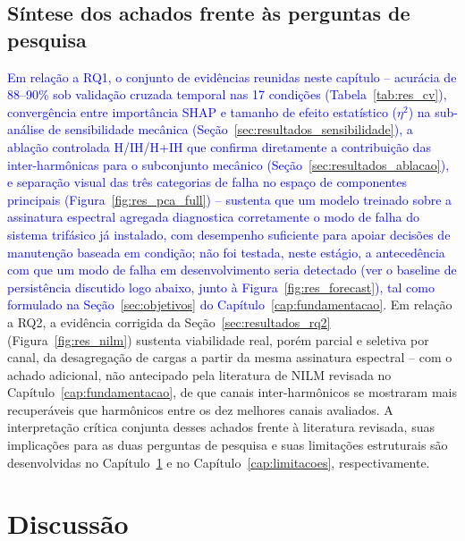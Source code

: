 \documentclass[times,final]{elsarticle}
\begin{document}
\subsection{Síntese dos achados frente às perguntas de pesquisa}
\label{sec:resultados_sintese}

\textcolor{blue}{Em relação a RQ1, o conjunto de evidências reunidas neste capítulo -- acurácia de 88--90\% sob validação cruzada temporal nas 17 condições (Tabela~\ref{tab:res_cv}), convergência entre importância SHAP e tamanho de efeito estatístico ($\eta^2$) na sub-análise de sensibilidade mecânica (Seção~\ref{sec:resultados_sensibilidade}), a ablação controlada H/IH/H+IH que confirma diretamente a contribuição das inter-harmônicas para o subconjunto mecânico (Seção~\ref{sec:resultados_ablacao}), e separação visual das três categorias de falha no espaço de componentes principais (Figura~\ref{fig:res_pca_full}) -- sustenta que um modelo treinado sobre a assinatura espectral agregada diagnostica corretamente o modo de falha do sistema trifásico já instalado, com desempenho suficiente para apoiar decisões de manutenção baseada em condição; não foi testada, neste estágio, a antecedência com que um modo de falha em desenvolvimento seria detectado (ver o baseline de persistência discutido logo abaixo, junto à Figura~\ref{fig:res_forecast}), tal como formulado na Seção~\ref{sec:objetivos} do Capítulo~\ref{cap:fundamentacao}.} Em relação a RQ2, a evidência corrigida da Seção~\ref{sec:resultados_rq2} (Figura~\ref{fig:res_nilm}) sustenta viabilidade real, porém parcial e seletiva por canal, da desagregação de cargas a partir da mesma assinatura espectral -- com o achado adicional, não antecipado pela literatura de NILM revisada no Capítulo~\ref{cap:fundamentacao}, de que canais inter-harmônicos se mostraram mais recuperáveis que harmônicos entre os dez melhores canais avaliados. A interpretação crítica conjunta desses achados frente à literatura revisada, suas implicações para as duas perguntas de pesquisa e suas limitações estruturais são desenvolvidas no Capítulo~\ref{cap:discussao} e no Capítulo~\ref{cap:limitacoes}, respectivamente.
\section{Discussão}
\label{cap:discussao}
\end{document}
